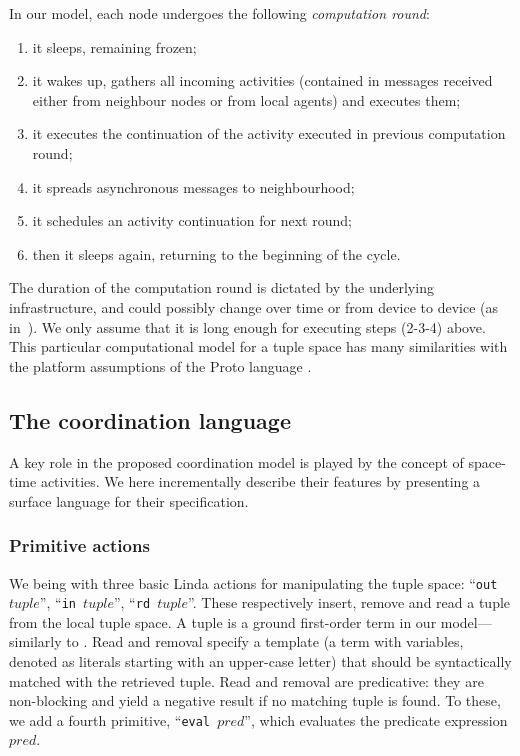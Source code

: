 \documentclass[12pt,a4paper,twoside,openright]{book}
\begin{document}
In our model, each node undergoes the following \emph{computation round}:
\begin{enumerate}
 \item it sleeps, remaining frozen;
 \item it wakes up, gathers all incoming activities (contained in messages received either from neighbour nodes or from local agents) and executes them;
 \item it executes the continuation of the activity executed in previous computation round;
 \item it spreads asynchronous messages to neighbourhood;
 \item it schedules an activity continuation for next round;
 \item then it sleeps again, returning to the beginning of the cycle.
\end{enumerate}
%
The duration of the computation round is dictated by the underlying infrastructure, and could possibly change over time or from device to device (as in~\cite{ProtoTime}).
%
We only assume that it is long enough for executing steps (2-3-4) above.
%
This particular computational model for a tuple space has many similarities with the platform assumptions of the Proto language \cite{proto,spatialcomputing-sac11,spatialcomputing-scp78}.

\subsection{The coordination language}

A key role in the proposed coordination model is played by the concept of space-time activities.
%
We here incrementally describe their features by presenting a surface language for their specification.

\subsubsection*{Primitive actions}

We being with three basic Linda actions for manipulating the tuple space: ``\texttt{out $tuple$}'', ``\texttt{in $tuple$}'', ``\texttt{rd $tuple$}''. 
%
These respectively insert, remove and read a tuple from the local tuple space.
%
A tuple is a ground first-order term in our model---similarly to \cite{tucson-aamas99}.
%
Read and removal specify a template (a term with variables, denoted as literals starting with an upper-case letter) that should be syntactically matched with the retrieved tuple. 
%
Read and removal are predicative: they are non-blocking and yield a negative result if no matching tuple is found. 
%
To these, we add a fourth primitive, ``\texttt{eval $pred$}'', which evaluates the predicate expression $pred$.
\end{document}
